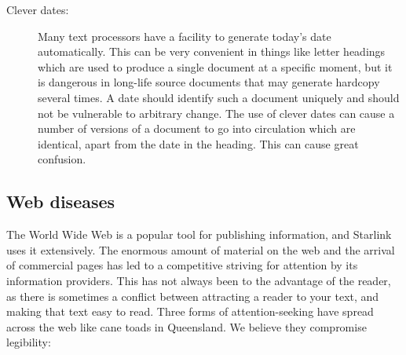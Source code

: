 \documentclass[twoside,11pt,nolof]{starlink}
\begin{document}
\begin{description}
\item [Clever dates:]

Many text processors have a facility to generate today's date automatically.
This can be very convenient in things like letter headings which are used
to produce a single document at a specific moment, but it is dangerous in
long-life source documents that may generate hardcopy several times.
A date should identify such a document uniquely and should not be vulnerable to
arbitrary change.
The use of clever dates can cause a number of versions of a document to go
into circulation which are identical, apart from the date in the heading.
This can cause great confusion.

\end{description}

\subsection{Web diseases}

The World Wide Web is a popular tool for publishing information,
and Starlink uses it extensively.
The enormous amount of material on the web and the arrival of commercial pages
has led to a competitive striving for attention by its information providers.
This has not always been to the advantage of the reader, as there is sometimes
a conflict between attracting a reader to your text, and making that text
easy to read.
Three forms of attention-seeking have spread across the web like cane toads in
Queensland.
We believe they compromise legibility:
\end{document}
